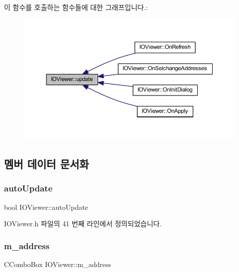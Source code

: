 이 함수를 호출하는 함수들에 대한 그래프입니다.\+:
\nopagebreak
\begin{figure}[H]
\begin{center}
\leavevmode
\includegraphics[width=350pt]{class_i_o_viewer_a500c8fc593280ff95977fb59293b6ab6_icgraph}
\end{center}
\end{figure}


\subsection{멤버 데이터 문서화}
\mbox{\label{class_i_o_viewer_a6f3bc2241e369ffba682365f58412dc7}} 
\subsubsection{\texorpdfstring{auto\+Update}{autoUpdate}}
{\footnotesize\ttfamily bool I\+O\+Viewer\+::auto\+Update}



I\+O\+Viewer.\+h 파일의 41 번째 라인에서 정의되었습니다.

\mbox{\label{class_i_o_viewer_ab381b72aee2da8c7f3c25ba58c69c3cd}} 
\subsubsection{\texorpdfstring{m\+\_\+address}{m\_address}}
{\footnotesize\ttfamily C\+Combo\+Box I\+O\+Viewer\+::m\+\_\+address}



